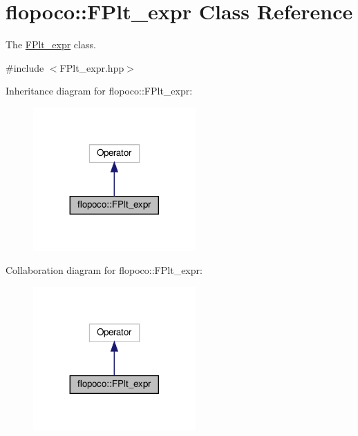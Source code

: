 \hypertarget{classflopoco_1_1FPlt__expr}{}\section{flopoco\+:\+:F\+Plt\+\_\+expr Class Reference}
\label{classflopoco_1_1FPlt__expr}


The \hyperlink{classflopoco_1_1FPlt__expr}{F\+Plt\+\_\+expr} class.  




{\ttfamily \#include $<$F\+Plt\+\_\+expr.\+hpp$>$}



Inheritance diagram for flopoco\+:\+:F\+Plt\+\_\+expr\+:
\nopagebreak
\begin{figure}[H]
\begin{center}
\leavevmode
\includegraphics[width=176pt]{d9/dca/classflopoco_1_1FPlt__expr__inherit__graph}
\end{center}
\end{figure}


Collaboration diagram for flopoco\+:\+:F\+Plt\+\_\+expr\+:
\nopagebreak
\begin{figure}[H]
\begin{center}
\leavevmode
\includegraphics[width=176pt]{d7/df1/classflopoco_1_1FPlt__expr__coll__graph}
\end{center}
\end{figure}
